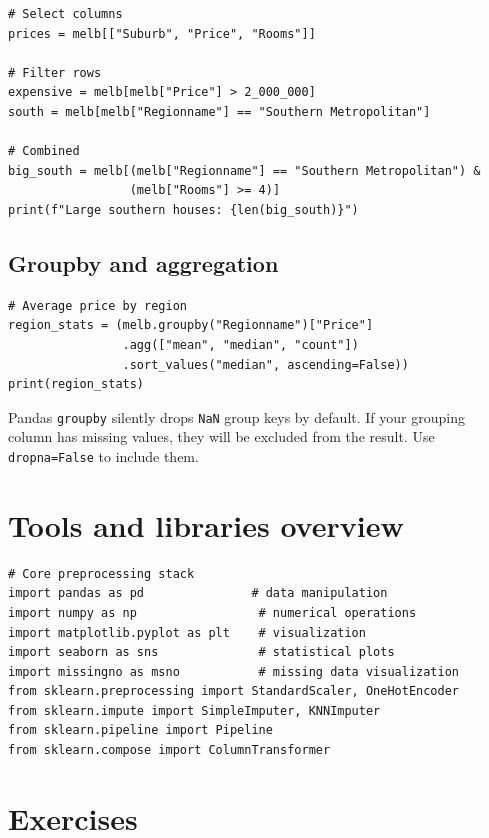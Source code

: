 \begin{verbatim}
# Select columns
prices = melb[["Suburb", "Price", "Rooms"]]

# Filter rows
expensive = melb[melb["Price"] > 2_000_000]
south = melb[melb["Regionname"] == "Southern Metropolitan"]

# Combined
big_south = melb[(melb["Regionname"] == "Southern Metropolitan") &
                 (melb["Rooms"] >= 4)]
print(f"Large southern houses: {len(big_south)}")
\end{verbatim}

\subsection{Groupby and aggregation}

\begin{verbatim}
# Average price by region
region_stats = (melb.groupby("Regionname")["Price"]
                .agg(["mean", "median", "count"])
                .sort_values("median", ascending=False))
print(region_stats)
\end{verbatim}

\begin{warningbox}
Pandas \texttt{groupby} silently drops \texttt{NaN} group keys by default. If your grouping column has missing values, they will be excluded from the result. Use \texttt{dropna=False} to include them.
\end{warningbox}

\section{Tools and libraries overview}

\begin{verbatim}
# Core preprocessing stack
import pandas as pd               # data manipulation
import numpy as np                 # numerical operations
import matplotlib.pyplot as plt    # visualization
import seaborn as sns              # statistical plots
import missingno as msno           # missing data visualization
from sklearn.preprocessing import StandardScaler, OneHotEncoder
from sklearn.impute import SimpleImputer, KNNImputer
from sklearn.pipeline import Pipeline
from sklearn.compose import ColumnTransformer
\end{verbatim}

\section{Exercises}

